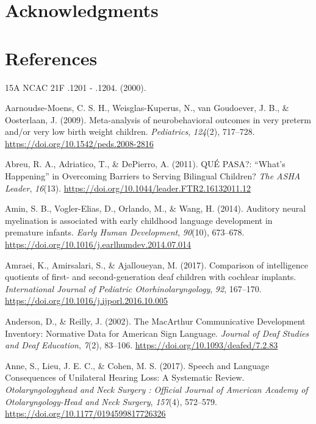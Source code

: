 \documentclass[
  english,
  man]{apa6}
\begin{document}
\hypertarget{acknowledgments}{%
\section{Acknowledgments}\label{acknowledgments}}

\pagebreak

\hypertarget{references}{%
\section*{References}\label{references}}

\hypertarget{refs}{}
\leavevmode\hypertarget{ref-2000}{}%
15A NCAC 21F .1201 - .1204. (2000).

\leavevmode\hypertarget{ref-aarnoudse-moens2009}{}%
Aarnoudse-Moens, C. S. H., Weisglas-Kuperus, N., van Goudoever, J. B., \& Oosterlaan, J. (2009). Meta-analysis of neurobehavioral outcomes in very preterm and/or very low birth weight children. \emph{Pediatrics}, \emph{124}(2), 717--728. \url{https://doi.org/10.1542/peds.2008-2816}

\leavevmode\hypertarget{ref-abreu2011}{}%
Abreu, R. A., Adriatico, T., \& DePierro, A. (2011). QUÉ PASA?: ``What's Happening'' in Overcoming Barriers to Serving Bilingual Children? \emph{The ASHA Leader}, \emph{16}(13). \url{https://doi.org/10.1044/leader.FTR2.16132011.12}

\leavevmode\hypertarget{ref-amin2014}{}%
Amin, S. B., Vogler-Elias, D., Orlando, M., \& Wang, H. (2014). Auditory neural myelination is associated with early childhood language development in premature infants. \emph{Early Human Development}, \emph{90}(10), 673--678. \url{https://doi.org/10.1016/j.earlhumdev.2014.07.014}

\leavevmode\hypertarget{ref-amraei2017}{}%
Amraei, K., Amirsalari, S., \& Ajalloueyan, M. (2017). Comparison of intelligence quotients of first- and second-generation deaf children with cochlear implants. \emph{International Journal of Pediatric Otorhinolaryngology}, \emph{92}, 167--170. \url{https://doi.org/10.1016/j.ijporl.2016.10.005}

\leavevmode\hypertarget{ref-anderson2002}{}%
Anderson, D., \& Reilly, J. (2002). The MacArthur Communicative Development Inventory: Normative Data for American Sign Language. \emph{Journal of Deaf Studies and Deaf Education}, \emph{7}(2), 83--106. \url{https://doi.org/10.1093/deafed/7.2.83}

\leavevmode\hypertarget{ref-anne2017}{}%
Anne, S., Lieu, J. E. C., \& Cohen, M. S. (2017). Speech and Language Consequences of Unilateral Hearing Loss: A Systematic Review. \emph{Otolaryngologyhead and Neck Surgery : Official Journal of American Academy of Otolaryngology-Head and Neck Surgery}, \emph{157}(4), 572--579. \url{https://doi.org/10.1177/0194599817726326}
\end{document}

